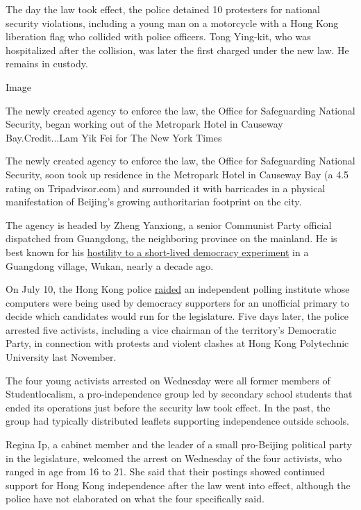 The day the law took effect, the police detained 10 protesters for
national security violations, including a young man on a motorcycle with
a Hong Kong liberation flag who collided with police officers. Tong
Ying-kit, who was hospitalized after the collision, was later the first
charged under the new law. He remains in custody.

Image

The newly created agency to enforce the law, the Office for Safeguarding
National Security, began working out of the Metropark Hotel in Causeway
Bay.Credit...Lam Yik Fei for The New York Times

The newly created agency to enforce the law, the Office for Safeguarding
National Security, soon took up residence in the Metropark Hotel in
Causeway Bay (a 4.5 rating on Tripadvisor.com) and surrounded it with
barricades in a physical manifestation of Beijing's growing
authoritarian footprint on the city.

The agency is headed by Zheng Yanxiong, a senior Communist Party
official dispatched from Guangdong, the neighboring province on the
mainland. He is best known for his
\href{https://www.nytimes.com/2011/12/31/world/asia/chinese-official-wang-yang-tests-new-political-approach.html}{hostility
to a short-lived democracy experiment} in a Guangdong village, Wukan,
nearly a decade ago.

On July 10, the Hong Kong police
\href{https://www.nytimes.com/2020/07/10/world/asia/hong-kong-police-raid-pollster.html}{raided}
an independent polling institute whose computers were being used by
democracy supporters for an unofficial primary to decide which
candidates would run for the legislature. Five days later, the police
arrested five activists, including a vice chairman of the territory's
Democratic Party, in connection with protests and violent clashes at
Hong Kong Polytechnic University last November.

The four young activists arrested on Wednesday were all former members
of Studentlocalism, a pro-independence group led by secondary school
students that ended its operations just before the security law took
effect. In the past, the group had typically distributed leaflets
supporting independence outside schools.

Regina Ip, a cabinet member and the leader of a small pro-Beijing
political party in the legislature, welcomed the arrest on Wednesday of
the four activists, who ranged in age from 16 to 21. She said that their
postings showed continued support for Hong Kong independence after the
law went into effect, although the police have not elaborated on what
the four specifically said.

